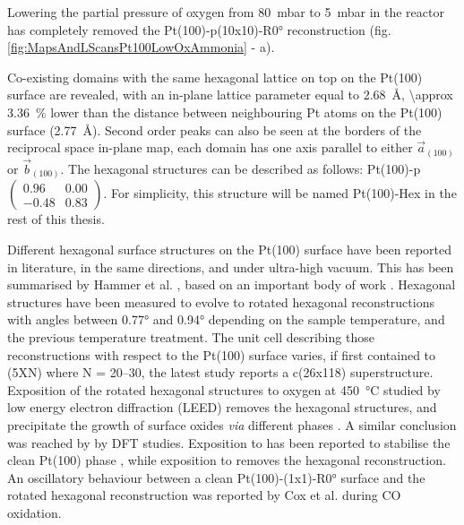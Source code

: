 Lowering the partial pressure of oxygen from \qty{80}{\milli\bar} to \qty{5}{\milli\bar} in the reactor has completely removed the Pt(100)-p(10x10)-R\ang{0} reconstruction (fig. \ref{fig:MapsAndLScansPt100LowOxAmmonia} - a).

Co-existing domains with the same hexagonal lattice on top on the Pt(100) surface are revealed, with an in-plane lattice parameter equal to \qty{2.68}{\angstrom}, \qty{\approx 3.36}{\percent} lower than the distance between neighbouring Pt atoms on the Pt(100) surface (\qty{2.77}{\angstrom}).
Second order peaks can also be seen at the borders of the reciprocal space in-plane map, each domain has one axis parallel to either $\vec{a}_{(100)}$ or $\vec{b}_{(100)}$.
The hexagonal structures can be described as follows: Pt(100)-p$\begin{pmatrix} 0.96 & 0.00\\ -0.48 & 0.83 \end{pmatrix}$.
For simplicity, this structure will be named Pt(100)-Hex in the rest of this thesis.

Different hexagonal surface structures on the Pt(100) surface have been reported in literature, in the same directions, and under ultra-high vacuum.
This has been summarised by Hammer et al. \parencite*{Hammer2016}, based on an important body of work \parencite{Heilmann1979, Vanhove1981, Heinz1982, Mase1992, Kuhnke1992, Borg1994, VanBeurden2004, Havu2010}.
Hexagonal structures have been measured to evolve to rotated hexagonal reconstructions with angles between \ang{0.77} and \ang{0.94} depending on the sample temperature, and the previous temperature treatment.
The unit cell describing those reconstructions with respect to the Pt(100) surface varies, if first contained to (5XN) where N = 20–30, the latest study reports a c(26x118) superstructure.
Exposition of the rotated hexagonal structures to oxygen at \qty{450}{\degreeCelsius} studied by low energy electron diffraction (LEED) removes the hexagonal structures, and precipitate the growth of surface oxides \textit{via} different phases \parencite{BradleyShumbera2007, BradleyShumbera2007a}.
A similar conclusion was reached by \cite{Deskins2005} by DFT studies.
Exposition to  has been reported to stabilise the clean Pt(100) phase \parencite{Heinz1982}, while exposition to  removes the hexagonal reconstruction.
An oscillatory behaviour between a clean Pt(100)-(1x1)-R\ang{0} surface and the rotated hexagonal reconstruction was reported by Cox et al. \parencite*{Cox1983} during CO oxidation.

